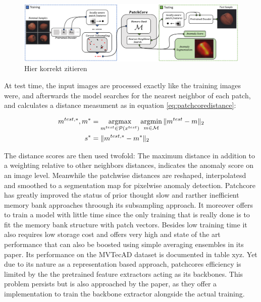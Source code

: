 \begin{figure}[ht]
    \centering
    \includegraphics[width=\textwidth]{figures/pathcore_architecture.png}
    \caption{Hier korrekt zitieren}
    \label{fig:patchcorearchitecture}
\end{figure}

At test time, the input images are processed exactly like the training images were, and afterwards the model searches for the nearest neighbor of each patch, and calculates a distance measument as 
in equation \ref{eq:patchcoredistance}:

\begin{equation}
\label{eq:patchcoredistance}
\begin{split}
m^{test, *}, m^{*} &= \operatorname*{argmax}_{m^{test} \in \mathcal{P}(x^{test})} \operatorname*{argmin}_{m \in \mathcal{M}} \| m^{test} - m \|_{2} \\
s^{*} &= \| m^{test, *} - m^{*} \|_{2}
\end{split}
\end{equation}

The distance scores are then used twofold: The maximum distance in addition to a weighting relative to other neighbors distances, indicates the anomaly score on an image level. Meanwhile the patchwise distances are reshaped, 
interpolatesd and smoothed to a segmentation map for pixelwise anomaly detection.
\newline
Patchcore has greatly improved the status of prior thought slow and rarther inefficient memory bank approaches throough its subsampling approach. It moreover offers to train a model with little time 
since the only training that is really done is to fit the memory bank structure with patch vectors. Besides low training time it also requires low storage cost and offers very high and state of the art 
performance that can also be boosted using simple averaging ensembles in its paper. Its performance on the MVTecAD dataset \cite{MVTEC_Bergmann_2021} is documented in table xyz. Yet due to its nature as a representation based approach, patchcores 
efficiency is limited by the the pretrained feature extractors acting as its backbones. This problem persists but is also approached by the paper, as they offer a implementation to train the backbone 
extractor alongside the actual training.


